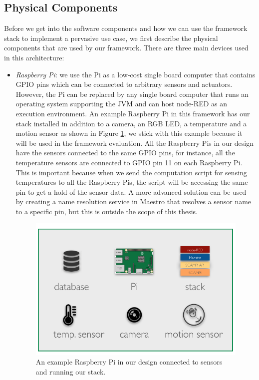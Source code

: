\subsection{Physical Components}
Before we get into the software components and how we can use the framework stack to implement a pervasive use case, we first describe the physical components that are used by our framework. There are three main devices used in this architecture:
\begin{itemize}
\item \textit{Raspberry Pi}: we use the Pi as a low-cost single board computer that contains GPIO pins which can be connected to arbitrary sensors and actuators.  However, the Pi can be replaced by any single board computer that runs an operating system supporting the JVM and can host node-RED as an execution environment. An example Raspberry Pi in this framework has our stack installed in addition to a camera,  an RGB LED, a temperature and a motion sensor as shown in Figure \ref{fig:node}, we stick with this example because it will be used in the framework evaluation. All the Raspberry Pis in our design have the sensors connected to the same GPIO pins, for instance, all the temperature sensors are connected to GPIO pin 11 on each  Raspberry Pi. This is important because when we send the computation script for sensing temperatures to all the Raspberry Pis, the script will be accessing the same pin to get a hold of the sensor data. A more advanced solution can be used by creating a name resolution service in Maestro that resolves a sensor name to a specific pin, but this is outside the scope of this thesis.  \\



\begin{figure}[H]
	\centering
	\includegraphics[scale=0.5]{images/node.png}
	\caption{An example  Raspberry Pi in our design connected to sensors and running our stack. }
	\label{fig:node}
\end{figure}


\end{itemize}
